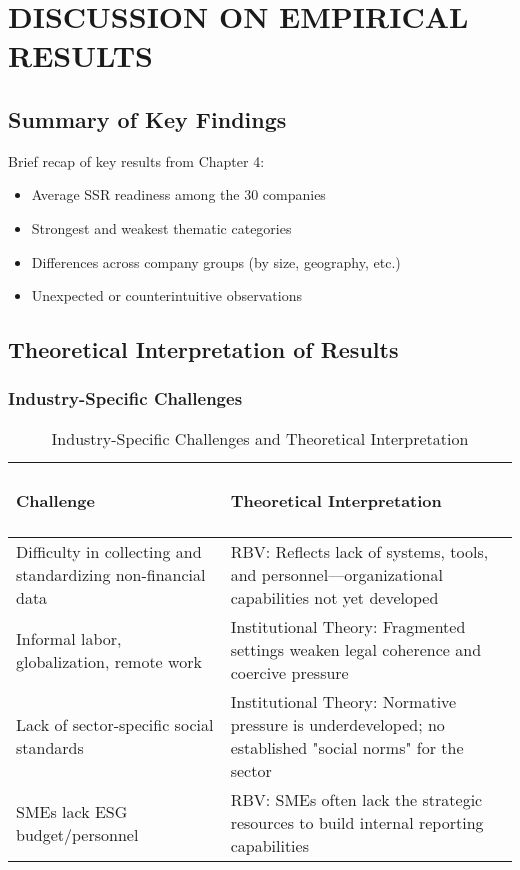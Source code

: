 \chapter{DISCUSSION ON EMPIRICAL RESULTS}

\section{Summary of Key Findings}
Brief recap of key results from Chapter 4:
\begin{itemize}
    \item Average SSR readiness among the 30 companies
    \item Strongest and weakest thematic categories
    \item Differences across company groups (by size, geography, etc.)
    \item Unexpected or counterintuitive observations
\end{itemize}

\section{Theoretical Interpretation of Results}
\subsection{Industry-Specific Challenges}

\begin{table}[H]
    \centering
    \caption{Industry-Specific Challenges and Theoretical Interpretation}
    \begin{tabular}{p{6cm}|p{8cm}}
        \subsubsection{Challenge} & \subsubsection{Theoretical Interpretation} \\
        \hline
        Difficulty in collecting and standardizing non-financial data & RBV: Reflects lack of systems, tools, and personnel—organizational capabilities not yet developed \\
        \hline
        Informal labor, globalization, remote work & Institutional Theory: Fragmented settings weaken legal coherence and coercive pressure \\
        \hline
        Lack of sector-specific social standards & Institutional Theory: Normative pressure is underdeveloped; no established "social norms" for the sector \\
        \hline
        SMEs lack ESG budget/personnel & RBV: SMEs often lack the strategic resources to build internal reporting capabilities
    \end{tabular}
\end{table}

